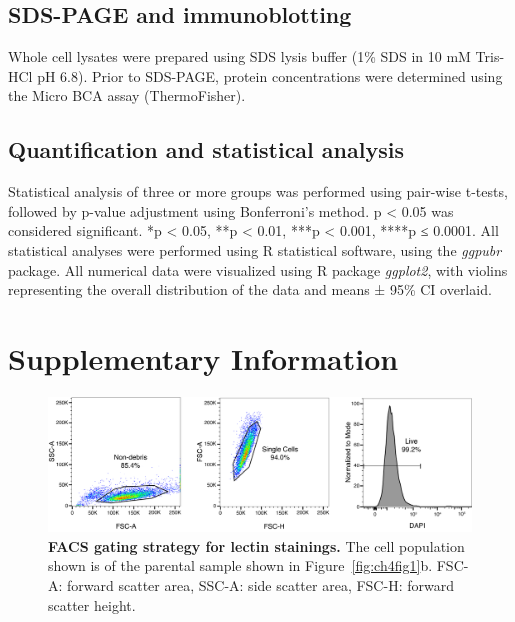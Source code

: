 \subsection{SDS-PAGE and immunoblotting}

Whole cell lysates were prepared using SDS lysis buffer (1\% SDS in 10 mM Tris-HCl pH 6.8). Prior to SDS-PAGE, protein concentrations were determined using the Micro BCA assay (ThermoFisher). 

\subsection{Quantification and statistical analysis}

Statistical analysis of three or more groups was performed using pair-wise t-tests, followed by p-value adjustment using Bonferroni’s method. p < 0.05 was considered significant. *p < 0.05, **p < 0.01, ***p < 0.001, ****p ≤ 0.0001. All statistical analyses were performed using R statistical software, using the \emph{ggpubr} package. All numerical data were visualized using R package \emph{ggplot2}\cite{wickham_ggplot2:_2016}, with violins representing the overall distribution of the data and means ± 95\% CI overlaid. 

\clearpage

\section{Supplementary Information}

\clearpage

\begin{figure}
    \includegraphics[keepaspectratio=true,width=\textwidth,height=\textheight]{chapters/chapter4/chapter4_SupplementaryFigure1.pdf}
    \caption{\textbf{FACS gating strategy for lectin stainings.} The cell population shown is of the parental sample shown in Figure~\ref{fig:ch4fig1}b. FSC-A: forward scatter area, SSC-A: side scatter area, FSC-H: forward scatter height.}
    \label{fig:ch4supfig1}
\end{figure}

